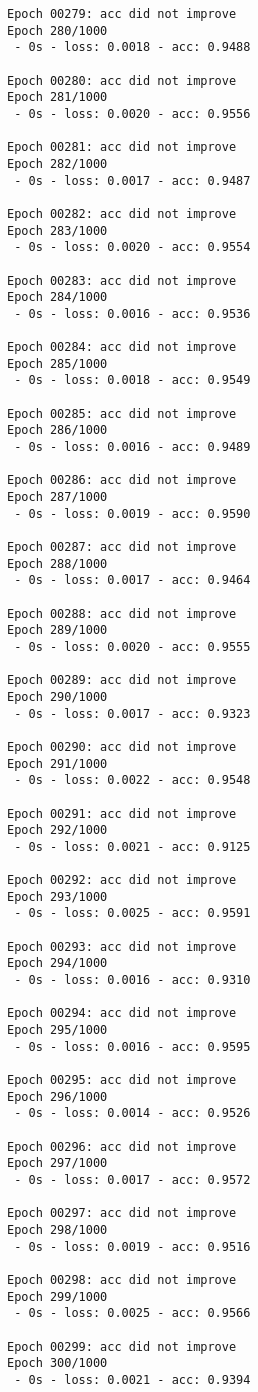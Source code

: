 \documentclass[11pt]{article}
\begin{document}
\begin{Verbatim}[commandchars=\\\{\}]
Epoch 00279: acc did not improve
Epoch 280/1000
 - 0s - loss: 0.0018 - acc: 0.9488

Epoch 00280: acc did not improve
Epoch 281/1000
 - 0s - loss: 0.0020 - acc: 0.9556

Epoch 00281: acc did not improve
Epoch 282/1000
 - 0s - loss: 0.0017 - acc: 0.9487

Epoch 00282: acc did not improve
Epoch 283/1000
 - 0s - loss: 0.0020 - acc: 0.9554

Epoch 00283: acc did not improve
Epoch 284/1000
 - 0s - loss: 0.0016 - acc: 0.9536

Epoch 00284: acc did not improve
Epoch 285/1000
 - 0s - loss: 0.0018 - acc: 0.9549

Epoch 00285: acc did not improve
Epoch 286/1000
 - 0s - loss: 0.0016 - acc: 0.9489

Epoch 00286: acc did not improve
Epoch 287/1000
 - 0s - loss: 0.0019 - acc: 0.9590

Epoch 00287: acc did not improve
Epoch 288/1000
 - 0s - loss: 0.0017 - acc: 0.9464

Epoch 00288: acc did not improve
Epoch 289/1000
 - 0s - loss: 0.0020 - acc: 0.9555

Epoch 00289: acc did not improve
Epoch 290/1000
 - 0s - loss: 0.0017 - acc: 0.9323

Epoch 00290: acc did not improve
Epoch 291/1000
 - 0s - loss: 0.0022 - acc: 0.9548

Epoch 00291: acc did not improve
Epoch 292/1000
 - 0s - loss: 0.0021 - acc: 0.9125

Epoch 00292: acc did not improve
Epoch 293/1000
 - 0s - loss: 0.0025 - acc: 0.9591

Epoch 00293: acc did not improve
Epoch 294/1000
 - 0s - loss: 0.0016 - acc: 0.9310

Epoch 00294: acc did not improve
Epoch 295/1000
 - 0s - loss: 0.0016 - acc: 0.9595

Epoch 00295: acc did not improve
Epoch 296/1000
 - 0s - loss: 0.0014 - acc: 0.9526

Epoch 00296: acc did not improve
Epoch 297/1000
 - 0s - loss: 0.0017 - acc: 0.9572

Epoch 00297: acc did not improve
Epoch 298/1000
 - 0s - loss: 0.0019 - acc: 0.9516

Epoch 00298: acc did not improve
Epoch 299/1000
 - 0s - loss: 0.0025 - acc: 0.9566

Epoch 00299: acc did not improve
Epoch 300/1000
 - 0s - loss: 0.0021 - acc: 0.9394


\end{Verbatim}
\end{document}
